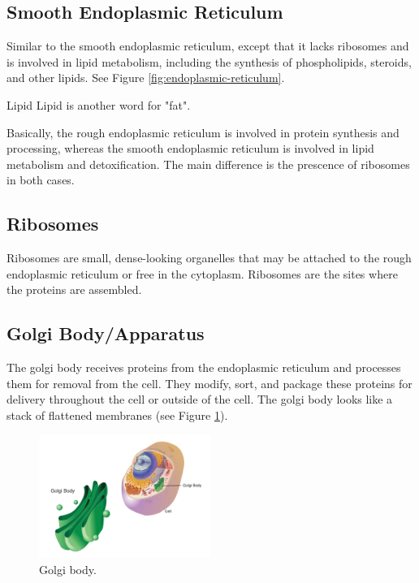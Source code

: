 \documentclass[12pt]{report}
\begin{document}
\subsection{Smooth Endoplasmic Reticulum}
\begin{definition}
    Similar to the smooth endoplasmic reticulum, except that it lacks ribosomes and is involved in lipid metabolism, including the synthesis of phospholipids, steroids, and other lipids. See Figure \ref{fig:endoplasmic-reticulum}. 
\end{definition}

\begin{note}{Lipid}
    Lipid is another word for "fat".
\end{note}

Basically, the rough endoplasmic reticulum is involved in protein synthesis and processing, whereas the smooth endoplasmic reticulum is involved in lipid metabolism and detoxification. The main difference is the prescence of ribosomes in both cases.

\subsection{Ribosomes}
\begin{definition}[Ribosomes]
    Ribosomes are small, dense-looking organelles that may be attached to the rough endoplasmic reticulum or free in the cytoplasm. Ribosomes are the sites where the proteins are assembled. 
\end{definition}

\subsection{Golgi Body/Apparatus}
\begin{definition}
    The golgi body receives proteins from the endoplasmic reticulum and processes them for removal from the cell. They modify, sort, and package these proteins for delivery throughout the cell or outside of the cell. The golgi body looks like a stack of flattened membranes (see Figure \ref{fig:golgi-body}).
\end{definition}

\begin{figure}[H]
\centering
    \includegraphics[width=0.5\textwidth]{../figures/golgi_body.jpg}
    \caption{Golgi body.}
    \label{fig:golgi-body}
\end{figure}
\end{document}
